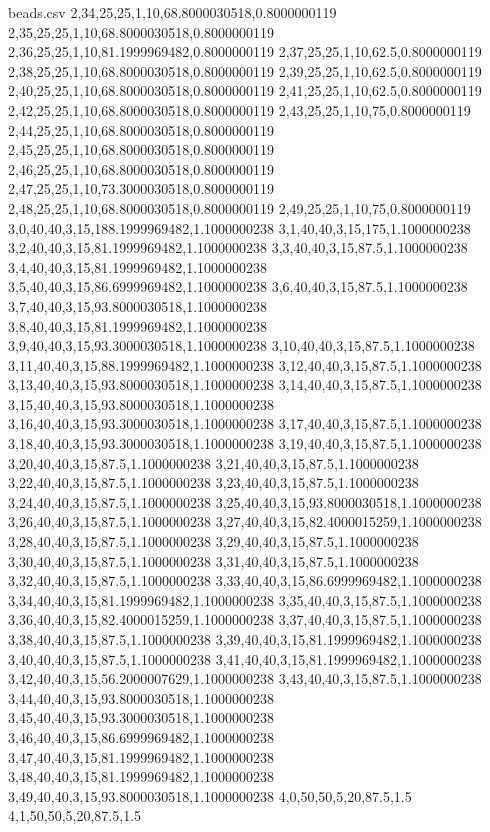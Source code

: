 \begin{filecontents*}{beads.csv}
2,34,25,25,1,10,68.8000030518,0.8000000119
2,35,25,25,1,10,68.8000030518,0.8000000119
2,36,25,25,1,10,81.1999969482,0.8000000119
2,37,25,25,1,10,62.5,0.8000000119
2,38,25,25,1,10,68.8000030518,0.8000000119
2,39,25,25,1,10,62.5,0.8000000119
2,40,25,25,1,10,68.8000030518,0.8000000119
2,41,25,25,1,10,62.5,0.8000000119
2,42,25,25,1,10,68.8000030518,0.8000000119
2,43,25,25,1,10,75,0.8000000119
2,44,25,25,1,10,68.8000030518,0.8000000119
2,45,25,25,1,10,68.8000030518,0.8000000119
2,46,25,25,1,10,68.8000030518,0.8000000119
2,47,25,25,1,10,73.3000030518,0.8000000119
2,48,25,25,1,10,68.8000030518,0.8000000119
2,49,25,25,1,10,75,0.8000000119
3,0,40,40,3,15,188.1999969482,1.1000000238
3,1,40,40,3,15,175,1.1000000238
3,2,40,40,3,15,81.1999969482,1.1000000238
3,3,40,40,3,15,87.5,1.1000000238
3,4,40,40,3,15,81.1999969482,1.1000000238
3,5,40,40,3,15,86.6999969482,1.1000000238
3,6,40,40,3,15,87.5,1.1000000238
3,7,40,40,3,15,93.8000030518,1.1000000238
3,8,40,40,3,15,81.1999969482,1.1000000238
3,9,40,40,3,15,93.3000030518,1.1000000238
3,10,40,40,3,15,87.5,1.1000000238
3,11,40,40,3,15,88.1999969482,1.1000000238
3,12,40,40,3,15,87.5,1.1000000238
3,13,40,40,3,15,93.8000030518,1.1000000238
3,14,40,40,3,15,87.5,1.1000000238
3,15,40,40,3,15,93.8000030518,1.1000000238
3,16,40,40,3,15,93.3000030518,1.1000000238
3,17,40,40,3,15,87.5,1.1000000238
3,18,40,40,3,15,93.3000030518,1.1000000238
3,19,40,40,3,15,87.5,1.1000000238
3,20,40,40,3,15,87.5,1.1000000238
3,21,40,40,3,15,87.5,1.1000000238
3,22,40,40,3,15,87.5,1.1000000238
3,23,40,40,3,15,87.5,1.1000000238
3,24,40,40,3,15,87.5,1.1000000238
3,25,40,40,3,15,93.8000030518,1.1000000238
3,26,40,40,3,15,87.5,1.1000000238
3,27,40,40,3,15,82.4000015259,1.1000000238
3,28,40,40,3,15,87.5,1.1000000238
3,29,40,40,3,15,87.5,1.1000000238
3,30,40,40,3,15,87.5,1.1000000238
3,31,40,40,3,15,87.5,1.1000000238
3,32,40,40,3,15,87.5,1.1000000238
3,33,40,40,3,15,86.6999969482,1.1000000238
3,34,40,40,3,15,81.1999969482,1.1000000238
3,35,40,40,3,15,87.5,1.1000000238
3,36,40,40,3,15,82.4000015259,1.1000000238
3,37,40,40,3,15,87.5,1.1000000238
3,38,40,40,3,15,87.5,1.1000000238
3,39,40,40,3,15,81.1999969482,1.1000000238
3,40,40,40,3,15,87.5,1.1000000238
3,41,40,40,3,15,81.1999969482,1.1000000238
3,42,40,40,3,15,56.2000007629,1.1000000238
3,43,40,40,3,15,87.5,1.1000000238
3,44,40,40,3,15,93.8000030518,1.1000000238
3,45,40,40,3,15,93.3000030518,1.1000000238
3,46,40,40,3,15,86.6999969482,1.1000000238
3,47,40,40,3,15,81.1999969482,1.1000000238
3,48,40,40,3,15,81.1999969482,1.1000000238
3,49,40,40,3,15,93.8000030518,1.1000000238
4,0,50,50,5,20,87.5,1.5
4,1,50,50,5,20,87.5,1.5

\end{filecontents*}
